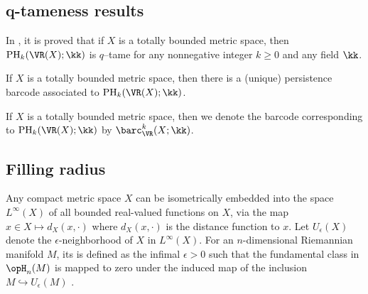 \subsection{q-tameness results}

\begin{remark}
	In \cite{bib11}, it is proved that if $X$ is a totally bounded metric space, then $\mathrm{PH}_k(\VR(X); \kk)$ is $q$–tame for any nonnegative integer $k \geq 0$ and any field $\kk$.
\end{remark}

\begin{theorem}
	If $X$ is a totally bounded metric space, then there is a (unique) persistence barcode associated to $\mathrm{PH}_k(\VR(X); \kk)$.
\end{theorem}

If $X$ is a totally bounded metric space, then we denote the barcode corresponding to $\mathrm{PH}_k(\VR(X); \kk)$ by $\barc_{\VR}^k(X; \kk)$.


\subsection{Filling radius}\label{ss:filling_radius}

Any compact metric space $X$ can be isometrically embedded into the space $L^\infty(X)$ of all bounded real-valued functions on $X$, via the map $x\in X\mapsto d_X(x,\cdot)$ where $d_X(x,\cdot)$ is the distance function to $x$. Let $U_\epsilon(X)$ denote the $\epsilon$-neighborhood of $X$ in $L^\infty(X)$.
For an $n$-dimensional Riemannian manifold $M$, its  is defined as the infimal $\epsilon>0$ such that the fundamental class in $\opH_n(M)$ is mapped to zero under the induced map of the inclusion $M \hookrightarrow U_\epsilon(M)$ \cite[page 108]{gromov2007metric}.

